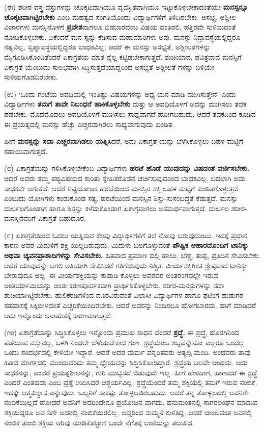 (ಈ) ಶರೀರ-ವಸ್ತ್ರ-ವಸ್ತುಗಳನ್ನು ಚೊಕ್ಕಟವಾಗಿಯೂ ವ್ಯವಸ್ಥಿತವಾಗಿಯೂ ಇಟ್ಟುಕೊಳ್ಳಬೇಕಾದಂತೆಯೇ \textbf{ಮನಸ್ಸನ್ನೂ ಚೊಕ್ಕಟವಾಗಿಟ್ಟಿರಬೇಕು} ಎಂಬ ಮಹತ್ವದ ಸಂಗತಿಯೊಂದು ವಿದ್ಯಾರ್ಥಿಗಳಿಗೆ ತಿಳಿದಿರಬೇಕು. ಅಸಭ್ಯ, ಅಶ್ಲೀಲ ವಿಚಾರಗಳು ಮನಸ್ಸಿನೊಳಗೆ \textbf{ಪ್ರವೇಶ}ವಾಗಲೂ ಬಿಡಬಾರದೆಂಬ ವಿಷಯ ವಂತಿರಲಿ, ಹತ್ತಿರವೇ ಸುಳಿಯದಂತೆ ನೋಡಿಕೊಳ್ಳಬೇಕು. ಏಕೆಂದರೆ ಮನ ಸ್ಸನ್ನು ಕೆಡಿಸುವ ಮಹಾಮಾರಿಗಳು ಅವು. ಮನಸ್ಸು ನಿದ್ರಾವಸ್ಥೆಯಲ್ಲಿದ್ದರೂ ನಷ್ಟವಿಲ್ಲ, ಸ್ವಪ್ನಾವಸ್ಥೆಯಲ್ಲಿದ್ದರೂ ಬಾಧಕವಿಲ್ಲ; ಆದರೆ ಈ ಮನಸ್ಸು ಅಸಭ್ಯತೆ, ಅಶ್ಲೀಲತೆಗಳನ್ನು ಮೈಗೂಡಿಸಿಕೊಂಡಿತೆಂದರೆ ಏಕಾಗ್ರತೆಯ ಮಾತ ನ್ನೆಲ್ಲ ಕಟ್ಟಿಡಬೇಕಾಗುತ್ತದೆ. ಶುಚಿಯಾದ, ಪವಿತ್ರವಾದ ಮನಸ್ಸಿಗೆ ಏಕಾಗ್ರತೆ ಯೆಂಬುದು ಸುಲಭವಾಗಿ ಸಿದ್ಧಿಸುತ್ತದೆಯಾದ್ದರಿಂದ ಅಸಭ್ಯತೆ ಅಶ್ಲೀಲತೆ ಗಳನ್ನು ಬಳಿಯೇ ಸುಳಿಯಗೊಡದಿರಬೇಕು.

(ಉ) ‘ಒಂದು ಗಂಟೆಯ ಅವಧಿಯಲ್ಲಿ ಇಂತಿಷ್ಟು ವಿಷಯಗಳನ್ನು ಅಧ್ಯ ಯನ ಮಾಡಿ ಮುಗಿಸುತ್ತೇನೆ’ ಎಂದು ವಿದ್ಯಾರ್ಥಿಗಳು \textbf{ತಮಗೆ ತಾವೇ ನಿಬಂಧನೆ ಹಾಕಿಕೊಳ್ಳಬೇಕು} ಮತ್ತು ಆ ಅವಧಿಯೊಳಗೆ ಅದನ್ನು ಮುಗಿಸಲು ತವಕ ಪಡಬೇಕು. ಮೊದಮೊದಲು ಅವಧಿಯೊಳಗೆ ಮುಗಿಸಲು ಸಾಧ್ಯವಾಗದೆ ಹೋಗಬಹುದು. ಆದರೆ ತವಕದಿಂದ ಕೂಡಿದ ಈ ಪ್ರಯತ್ನದಲ್ಲಿ ಮನಸ್ಸು ಹೆಚ್ಚು ಎಚ್ಚರವಾಗಿರಲು ಸಾಧ್ಯವಾಗುವುದು ಖಂಡಿತ.

ಹೀಗೆ \textbf{ಮನಸ್ಸನ್ನು ಸದಾ ಎಚ್ಚರವಾಗಿಡಲು ಯತ್ನಿಸಿ}ದರೆ, ಅದು ಏಕಾಗ್ರತೆ ಯನ್ನು ಬೆಳೆಸಿಕೊಳ್ಳಲು ಬಹಳ ಮಟ್ಟಿಗೆ ಸಹಾಯವಾಗುತ್ತದೆ.

(೮) ಏಕಾಗ್ರತೆಯನ್ನು ಗಳಿಸಿಕೊಳ್ಳಬೇಕೆಂಬ ವಿದ್ಯಾರ್ಥಿಗಳು \textbf{ಹರಟೆ ಹೊಡೆ ಯುವುದನ್ನು ವಿಷದಂತೆ ವರ್ಜಿಸಬೇಕು.} ಆದರೆ ಅವರು ತಮ್ಮ ಪಠ್ಯವಿಷಯದ ಕುರಿತು ಸ್ನೇಹಿತರೊಡನೆ ಚರ್ಚಿಸುವುದರಿಂದ ಬಾಧಕವಿಲ್ಲ. ಬದಲಾಗಿ ಅದು ಸಾಧಕವೇ ಆಗುತ್ತದೆ. ಆದರೆ ನಿಷ್ಟ್ರಯೋಜಕ ಹರಟೆಯಿಂದ ಮನಸ್ಸಿನ ಶಕ್ತಿ ಬಹಳ ಮಟ್ಟಿಗೆ ಕುಂಠಿತಗೊಳ್ಳುತ್ತದೆ ಎಂಬುದು ಯೋಗಿಗಳು ಕಂಡುಕೊಂಡ ಸತ್ಯ. ಹರಟೆಯಿಂದ ಮನಸ್ಸಿನ ಶಿಸ್ತು-ಸುಸಂಬದ್ಧತೆ ಕೆಡುತ್ತದೆ. ಮನಸ್ಸು ದುರ್ಬಲಗೊಂಡಾಗ ಹಾಗೂ ಶಿಸ್ತನ್ನು ಕಳೆದುಕೊಂಡಾಗ ಏಕಾಗ್ರವಾಗಲು ಅಸಮರ್ಥವಾಗುತ್ತದೆ. ದುರ್ಬಲ ಶರೀರ-ಮನಸ್ಸಿನವರಿಗೆ ಏಕಾಗ್ರತೆ ಬಹುದೂರ.

(೯) ಏಕಾಗ್ರತೆಯಿಂದ ಓದಲು ಯತ್ನಿಸುವ ಕೆಲವು ವಿದ್ಯಾರ್ಥಿಗಳಿಗೆ ತಲೆ ನೋವು ಬರುವುದುಂಟು. ಇದಕ್ಕೆ ಪ್ರಧಾನ ಕಾರಣ ಅವರ ಮಿದುಳಿಗೆ ಶಕ್ತಿ ಯಿಲ್ಲದಿರುವುದು. ಮಿದುಳು ಬಲಗೊಳ್ಳುವಂತೆ \textbf{ಪೌಷ್ಟಿಕ ಆಹಾರದೊಂದಿಗೆ ಟಾನಿಕ್ಕು ಅಥವಾ ಚ್ಯವನಪ್ರಾಶಾದಿಗಳನ್ನು ಸೇವಿಸಬೇಕು.} ಹಿತವಾದ ಪ್ರಮಾಣ ದಲ್ಲಿ ಹಾಲು, ಬೆಣ್ಣೆ, ತುಪ್ಪ, ಪ್ರತಿದಿನ ಸೇವಿಸಬೇಕು. ಆದರೆ ಯಾವುದನ್ನೇ ಆಗಲಿ ಅತಿಯಾಗಿ ಸೇವಿಸಿದರೆ ಗತಿಗೆಡುವುದು ನಿಶ್ಚಿತ. ವೀರ್ಯಶಕ್ತಿಗಿಂತ ಶ್ರೇಷ್ಠವಾದ ಟಾನಿಕ್ಕು ಬೇರಾವುದೂ ಅಲ್ಲ. ಈ ವೀರ್ಯಶಕ್ತಿಯನ್ನು ಕಾಪಾಡಿ ಕೊಳ್ಳಲು ಅವರವರ ಅಂತರಂಗದಲ್ಲೇ ಇರುವ ಅಂತರ್ಯಾಮಿಯನ್ನು ಅಂತಃ ಕರಣಪೂರ್ವಕವಾಗಿ ಪ್ರಾರ್ಥಿಸಿಕೊಳ್ಳಬೇಕು. ಶರೀರ-ಮನಸ್ಸುಗಳನ್ನು ಸದಾ ಶುಚಿಯಾಗಿಟ್ಟಿರಬೇಕು. ಹುಲಿಕರಡಿಗಳಿಂದ ದೂರವಿರುವಂತೆ ವಿಲಾಸೀ ವಿದ್ಯಾರ್ಥಿಗಳ ಹಾಗೂ ಫಟಿಂಗ ಹುಡುಗರ ಸಹವಾಸಕ್ಕೆ ಸಿಕ್ಕಿಬೀಳದಂತೆ ಎಚ್ಚರಿಕೆಯಿಂದಿರಬೇಕು. ಆದರೆ ಅವರನ್ನು ನಿಂದಿಸಲೂ ಹೋಗಬಾರದು. ಹಾಗೆ ಮಾಡಿದರೆ ಅದು ಇನ್ನೊಂದು ಅನಾಹುತಕ್ಕೆ ಕಾರಣವಾಗುತ್ತದೆ.

(೧ಂ) ಏಕಾಗ್ರತೆಯನ್ನು ಸಿದ್ಧಿಸಿಕೊಳ್ಳಲು ಇನ್ನೊಂದು ಪ್ರಮುಖ ಸಾಧನ ವೆಂದರೆ \textbf{ಶ್ರದ್ಧೆ.} ಈ ಶ್ರದ್ಧೆ, ಹೊರಗಿನಿಂದ ಪಡೆಯುವ ವಸ್ತುವಲ್ಲ, ಒಳಗಿ ನಿಂದಲೇ ಬೆಳೆಯಬೇಕಾದ ಗುಣ. ಶ್ರದ್ಧೆಯೆಂಬ ಶಬ್ದವನ್ನೇನೋ ಎಲ್ಲರೂ ಒಂದಲ್ಲ ಒಂದು ಸಂದರ್ಭದಲ್ಲಿ ಕೇಳಿಯೇ ಇದ್ದಾರೆ. ಆದರೆ ಅದರ ಮರ್ಮ ವನ್ನರಿತವರು ಅತ್ಯಲ್ಪ ಮಂದಿ. ಅಂಥವರು ತಾವು ಹಿಡಿದ ಮಾರ್ಗದಲ್ಲಿ ಮುಂದುವರಿದು ತಮ್ಮ ಧ್ಯೇಯವನ್ನು ಸಿದ್ಧಿಸಿಕೊಂಡಿದ್ದಾರೆ. ಶ್ರದ್ಧೆಯ ಬಲವೇ ಅಂಥದು. ಅದು ಸಾಧಕನನ್ನು, ಎಂದರೆ ಪ್ರಯತ್ನಶೀಲನನ್ನು, ಗುರಿ ಮುಟ್ಟಿಸದೆ ಬಿಡುವುದೇ ಇಲ್ಲ. ಹೀಗೆ ಹೇಳಿದಾಗ, ಹಾಗಾದರೆ ಈ ಶ್ರದ್ಧೆ ಎಂದರೆ ಎಂತಹದು ಎಂಬ ಪ್ರಶ್ನೆ ಉದಿಸಿದರೆ ಆಶ್ಚರ್ಯವಿಲ್ಲ. ಶ್ರದ್ಧೆಯೆಂದರೆ ತಮ್ಮ ಶಕ್ತಿಯಲ್ಲಿ ತಮಗೆ ಇರುವ ನಂಬಿಕೆ. ಇದಕ್ಕೇ ಆತ್ಮವಿಶ್ವಾಸ ಎನ್ನುವುದು. ಒಬ್ಬನಿಗೆ ಸಾಕಷ್ಟು ತೋಳ್ಬಲವಿರಬಹುದು. ಆದರೆ ತನ್ನ ತೋಳ್ಬಲದಲ್ಲಿ ಅವನಿಗೇ ನಂಬಿಕೆಯಿಲ್ಲದೆ ಹೋದರೆ ಅವನಿಗೆ ಅದರಿಂದೇನೂ ಪ್ರಯೋಜನ ವಾಗದು. ಹನುಮಂತನಲ್ಲಿ ಸಾಗರಲಂಘನ ಮಾಡುವ ಶಕ್ತಿಯಿದ್ದರೂ ಅವ ನಿಗೇ ಅದರಲ್ಲಿ ನಂಬಿಕೆಯಿರಲಿಲ್ಲ. ಆದ್ದರಿಂದ ಸುಮ್ಮನೆ ಕುಳಿತಿದ್ದ. ಆದರೆ ಜಾಂಬವಂತ ಅವನಲ್ಲಿ ನಂಬಿಕೆ ತುಂಬಿ ಶಕ್ತಿಯ ಅರಿವು ಮಾಡಿಕೊಟ್ಟಾಗ ಒಂದೇ ನೆಗೆತಕ್ಕೆ ಲಂಕೆಯನ್ನು ತಲುಪಿದ.

